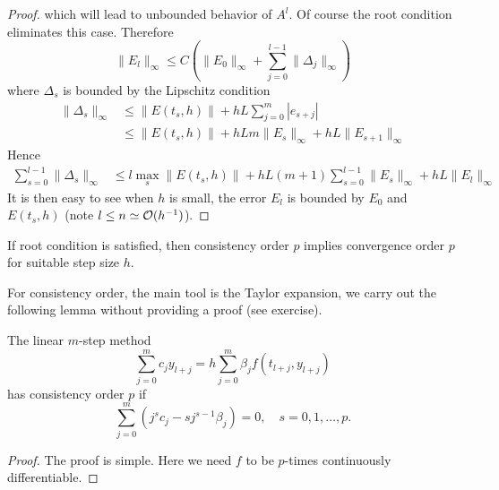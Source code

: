 \begin{proof}
    which will lead to unbounded behavior of $A^l$. Of course the root condition eliminates this case. Therefore 
    \begin{equation}
        \|E_{l}\|_{\infty} \le C \left( \|E_0\|_{\infty} + \sum_{j=0}^{l-1} \|\Delta_j\|_{\infty}\right) 
    \end{equation}
    where $\Delta_s$ is bounded by the Lipschitz condition 
    \begin{equation}
        \begin{aligned}
            \|\Delta_s\|_{\infty} & \le \|E(t_s, h)\| + h L \sum_{j=0}^m |e_{s+j}| \\
            & \le        \|E(t_s, h)\| + h L m \|E_s\|_{\infty} + hL \|E_{s+1}\|_{\infty}
        \end{aligned}
    \end{equation}
    Hence 
    \begin{equation}
        \begin{aligned}
           \sum_{s = 0}^{l-1} \|\Delta_s\|_{\infty} & \le l\max_{s}\|E(t_s, h)\| + h L (m +1) \sum_{s=0}^{l-1}\|E_s\|_{\infty} + hL \|E_{l}\|_{\infty}  
        \end{aligned}
    \end{equation}
    It is then easy to see when $h$ is small, the error $E_l$ is bounded by $E_0$ and $E(t_s, h)$ (note $l\le n\simeq \mathcal O(h^{-1})$). 
\end{proof}
\begin{corollary}
    If root condition is satisfied, then consistency order $p$ implies convergence order $p$ for suitable step size $h$.
\end{corollary} 
For consistency order, the main tool is the Taylor expansion, we carry out the following lemma without providing a proof (see exercise). 
\begin{lemma}\label{LEM: CONSISTENCY}
    The linear $m$-step method 
    \begin{equation}
        \sum_{j=0}^m c_j y_{l+j} = h \sum_{j=0}^m \beta_j f(t_{l + j}, y_{l+j})
    \end{equation}
    has consistency order $p$ if 
    \begin{equation}
        \sum_{j=0}^m (j^s c_j - s j^{s-1}\beta_j) = 0,\quad s = 0,1,\dots, p.
    \end{equation}
\end{lemma}
\begin{proof}
    The proof is simple. Here we need $f$ to be $p$-times continuously differentiable.
\end{proof}
